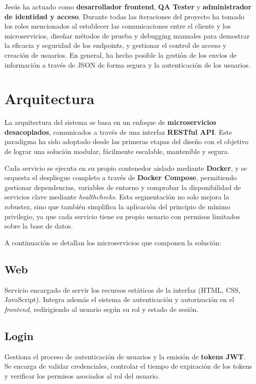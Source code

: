 \documentclass[11pt]{article}
\begin{document}
Jesús ha actuado como \textbf{desarrollador frontend}, \textbf{QA Tester} y \textbf{administrador de identidad y acceso}. Durante todas las iteraciones del proyecto ha tomado los roles mencionados al establecer las comunicaciones entre el cliente y los microservicios, diseñar métodos de prueba y debugging manuales para demostrar la eficacia y seguridad de los endpoints, y gestionar el control de acceso y creación de usuarios. En general, ha hecho posible la gestión de los envíos de información a través de JSON de forma segura y la autenticación de los usuarios.

\section{Arquitectura}

La arquitectura del sistema se basa en un enfoque de \textbf{microservicios desacoplados}, comunicados a través de una interfaz \textbf{RESTful API}. Este paradigma ha sido adoptado desde las primeras etapas del diseño con el objetivo de lograr una solución modular, fácilmente escalable, mantenible y segura.

Cada servicio se ejecuta en su propio contenedor aislado mediante \textbf{Docker}, y se orquesta el despliegue completo a través de \textbf{Docker Compose}, permitiendo gestionar dependencias, variables de entorno y comprobar la disponibilidad de servicios clave mediante \textit{healthchecks}. Esta segmentación no solo mejora la robustez, sino que también simplifica la aplicación del principio de mínimo privilegio, ya que cada servicio tiene su propio usuario con permisos limitados sobre la base de datos.

A continuación se detallan los microservicios que componen la solución:

\subsection*{Web}
Servicio encargado de servir los recursos estáticos de la interfaz (HTML, CSS, JavaScript). Integra además el sistema de autenticación y autorización en el \textit{frontend}, redirigiendo al usuario según su rol y estado de sesión.

\subsection*{Login}
Gestiona el proceso de autenticación de usuarios y la emisión de \textbf{tokens JWT}. Se encarga de validar credenciales, controlar el tiempo de expiración de los tokens y verificar los permisos asociados al rol del usuario.
\end{document}
